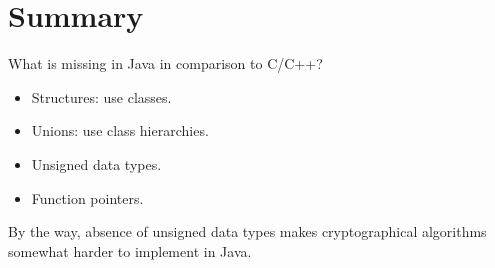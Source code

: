 \section{Summary}

What is missing in Java in comparison to C/C++?

\begin{itemize}
\item Structures: use classes.
\item Unions: use class hierarchies.
\item Unsigned data types.
\item Function pointers.
\end{itemize}

By the way, absence of unsigned data types makes cryptographical 
algorithms somewhat harder to implement in Java.
